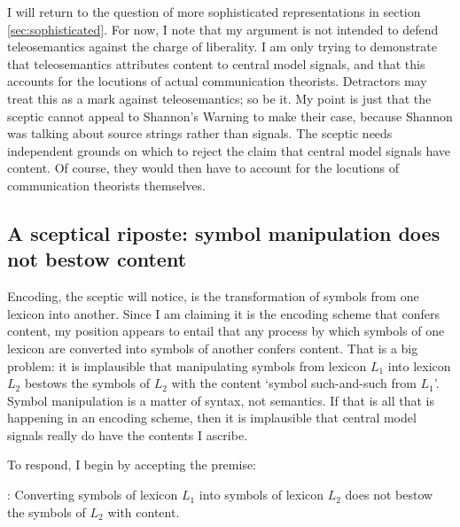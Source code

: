 \documentclass[12pt]{article}
\begin{document}
I will return to the question of more sophisticated representations in section \ref{sec:sophisticated}.
For now, I note that my argument is not intended to defend teleosemantics against the charge of liberality.
I am only trying to demonstrate that teleosemantics attributes content to central model signals, and that this accounts for the locutions of actual communication theorists.
Detractors may treat this as a mark against teleosemantics; so be it.
My point is just that the sceptic cannot appeal to {\sc Shannon's Warning} to make their case, because Shannon was talking about source strings rather than signals.
The sceptic needs independent grounds on which to reject the claim that central model signals have content.
Of course, they would then have to account for the locutions of communication theorists themselves.


\subsection{A sceptical riposte: symbol manipulation does not bestow content}

Encoding, the sceptic will notice, is the transformation of symbols from one lexicon into another.
Since I am claiming it is the encoding scheme that confers content, my position appears to entail that any process by which symbols of one lexicon are converted into symbols of another confers content.
That is a big problem: it is implausible that manipulating symbols from lexicon $L_1$ into lexicon $L_2$ bestows the symbols of $L_2$ with the content `symbol such-and-such from $L_1$'.
Symbol manipulation is a matter of syntax, not semantics.
If that is all that is happening in an encoding scheme, then it is implausible that central model signals really do have the contents I ascribe.

To respond, I begin by accepting the premise:

\begin{myquote}
\smi{}: Converting symbols of lexicon $L_1$ into symbols of lexicon $L_2$ does not bestow the symbols of $L_2$ with content.
\end{myquote}
\end{document}
